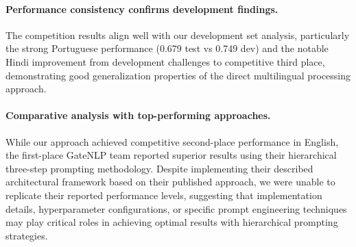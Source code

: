 \paragraph{Performance consistency confirms development findings.} The competition results align well with our development set analysis, particularly the strong Portuguese performance (0.679 test vs 0.749 dev) and the notable Hindi improvement from development challenges to competitive third place, demonstrating good generalization properties of the direct multilingual processing approach.

\paragraph{Comparative analysis with top-performing approaches.} While our approach achieved competitive second-place performance in English, the first-place GateNLP team \cite{Singh2025} reported superior results using their hierarchical three-step prompting methodology. Despite implementing their described architectural framework based on their published approach, we were unable to replicate their reported performance levels, suggesting that implementation details, hyperparameter configurations, or specific prompt engineering techniques may play critical roles in achieving optimal results with hierarchical prompting strategies.
